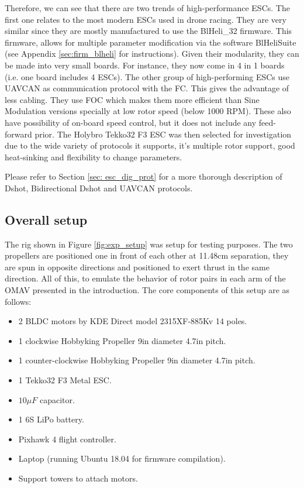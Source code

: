 Therefore, we can see that there are two trends of high-performance ESCs. The first one relates to the most modern ESCs used in drone racing. They are very similar since they are mostly manufactured to use the BlHeli\_32 firmware. This firmware, allows for multiple parameter modification via the software BlHeliSuite (see Appendix \ref{sec:firm_blheli} for instructions). Given their modularity, they can be made into very small boards. For instance, they now come in 4 in 1 boards (i.e. one board includes 4 ESCs). The other group of high-performing ESCs use UAVCAN as communication protocol with the FC. This gives the advantage of less cabling. They use FOC which makes them more efficient than Sine Modulation versions specially at low rotor speed (below 1000 RPM). These also have possibility of on-board speed control, but it does not include any feed-forward prior.  The Holybro Tekko32 F3 ESC was then selected for investigation due to the wide variety of protocols it supports, it's multiple rotor support, good heat-sinking and flexibility to change parameters.

 Please refer to Section \ref{sec: esc_dig_prot} for a more thorough description of Dshot, Bidirectional Dshot and UAVCAN protocols.

\subsection{Overall setup}

The rig shown in Figure \ref{fig:exp_setup} was setup for testing purposes. The two propellers are positioned one in front of each other at 11.48cm separation, they are spun in opposite directions and positioned to exert thrust in the same direction. All of this, to emulate the behavior of rotor pairs in each arm of the OMAV presented in the introduction. The core components of this setup are as follows:
\begin{itemize}
	\item 2 BLDC motors by KDE Direct model 2315XF-885Kv 14 poles.
	\item 1 clockwise Hobbyking Propeller 9in diameter 4.7in pitch.
	\item 1 counter-clockwise Hobbyking Propeller 9in diameter 4.7in pitch.
	\item 1 Tekko32 F3 Metal ESC.
	\item $10\mu F$ capacitor.
	\item 1 6S LiPo battery.
	\item Pixhawk 4 flight controller.
	\item Laptop (running Ubuntu 18.04 for firmware compilation).
	\item Support towers to attach motors.
\end{itemize}

